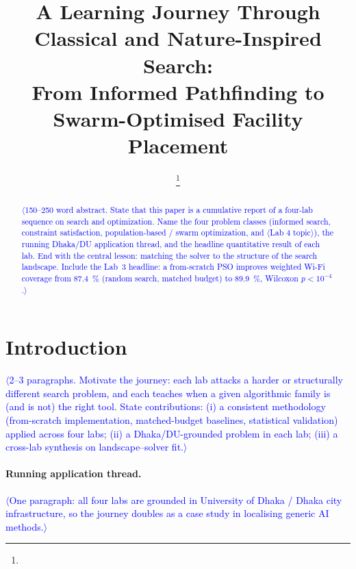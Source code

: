 \documentclass[11pt]{article}
\title{\textbf{A Learning Journey Through Classical and Nature-Inspired
Search:\\ From Informed Pathfinding to Swarm-Optimised Facility Placement}}
\author{
  \PH{Student One Full Name}\thanks{\PH{Dept. of CSE, University of Dhaka;
  email}} \and
  \PH{Student Two Full Name (if applicable)}
}
\date{\PH{Month Year}}
\newcommand{\PH}[1]{\textcolor{blue}{$\langle$#1$\rangle$}}   %
\begin{document}
\maketitle

\begin{abstract}
\PH{150--250 word abstract. State that this paper is a cumulative report of a
four-lab sequence on search and optimization. Name the four problem classes
(informed search, constraint satisfaction, population-based / swarm
optimization, and \PH{Lab 4 topic}), the running Dhaka/DU application thread,
and the headline quantitative result of each lab. End with the central lesson:
matching the solver to the structure of the search landscape. Include the Lab~3
headline: a from-scratch PSO improves weighted Wi-Fi coverage from
\SI{87.4}{\percent} (random search, matched budget) to \SI{89.9}{\percent},
Wilcoxon $p<10^{-4}$.}
\end{abstract}

\section{Introduction}
\label{sec:intro}
\PH{2--3 paragraphs. Motivate the journey: each lab attacks a harder or
structurally different search problem, and each teaches when a given algorithmic
family is (and is not) the right tool. State contributions:
(i) a consistent methodology (from-scratch implementation, matched-budget
baselines, statistical validation) applied across four labs;
(ii) a Dhaka/DU-grounded problem in each lab;
(iii) a cross-lab synthesis on landscape–solver fit.}

\paragraph{Running application thread.}
\PH{One paragraph: all four labs are grounded in University of Dhaka / Dhaka
city infrastructure, so the journey doubles as a case study in localising
generic AI methods.}

\end{document}
